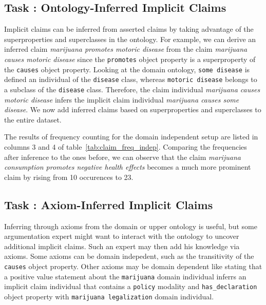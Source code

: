 \subsection{Task : Ontology-Inferred Implicit Claims}

Implicit claims can be inferred from asserted claims by taking advantage
of the superproperties and superclasses in the ontology. 
For example, we can derive an inferred claim
\emph{marijuana promotes motoric disease} from the claim 
\emph{marijuana causes motoric disease}
since the \texttt{promotes} object property is a superproperty of the
\texttt{causes} object property. 
Looking at the domain ontology, \texttt{some disease} is defined an individual 
of the \texttt{disease} class, whereas \texttt{motoric disease} belongs to a 
subclass of the \texttt{disease} class.
Therefore, the claim individual \emph{marijuana causes motoric disease}
infers the implicit claim individual \emph{marijuana causes some disease}. 
We now add inferred claims based on superproperties and 
superclasses to the entire dataset. 

The results of frequency counting for the domain independent setup 
are listed in columns 3 and 4 of table~\ref{tab:claim_freq_indep}. 
Comparing the frequencies after inference to the ones before, we can observe
that the claim \emph{marijuana consumption promotes negative health effects}
becomes a much more prominent claim by rising from 10 occurences to 23.

\subsection{Task : Axiom-Inferred Implicit Claims}

Inferring through axioms from the domain or upper ontology is useful, 
but some argumentation expert might want to interact with the ontology to
uncover additional implicit claims. Such an expert may then 
add his knowledge via axioms. Some axioms can be domain 
indepedent, such as the transitivity of the \texttt{causes} object property.
Other axioms may be domain dependent like stating
that a positive value statement about the \texttt{marijuana} domain 
individual inferrs an implicit claim individual that contains
 a \texttt{policy} modality and \texttt{has\_declaration} 
 object property with \texttt{marijuana legalization} domain individual.

